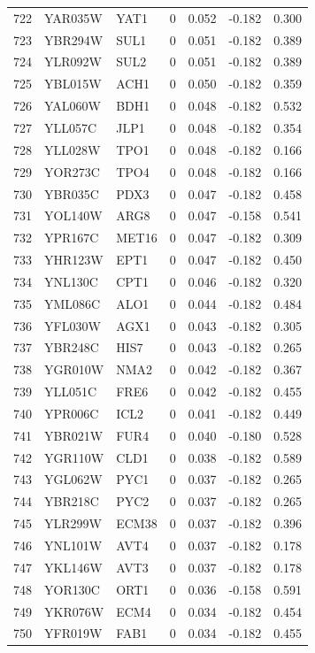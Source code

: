 \begin{longtable}{rllrrrr}
722 & YAR035W & YAT1 & 0 & 0.052 & -0.182 & 0.300\\
723 & YBR294W & SUL1 & 0 & 0.051 & -0.182 & 0.389\\
724 & YLR092W & SUL2 & 0 & 0.051 & -0.182 & 0.389\\
725 & YBL015W & ACH1 & 0 & 0.050 & -0.182 & 0.359\\
726 & YAL060W & BDH1 & 0 & 0.048 & -0.182 & 0.532\\
727 & YLL057C & JLP1 & 0 & 0.048 & -0.182 & 0.354\\
728 & YLL028W & TPO1 & 0 & 0.048 & -0.182 & 0.166\\
729 & YOR273C & TPO4 & 0 & 0.048 & -0.182 & 0.166\\
730 & YBR035C & PDX3 & 0 & 0.047 & -0.182 & 0.458\\
731 & YOL140W & ARG8 & 0 & 0.047 & -0.158 & 0.541\\
732 & YPR167C & MET16 & 0 & 0.047 & -0.182 & 0.309\\
733 & YHR123W & EPT1 & 0 & 0.047 & -0.182 & 0.450\\
734 & YNL130C & CPT1 & 0 & 0.046 & -0.182 & 0.320\\
735 & YML086C & ALO1 & 0 & 0.044 & -0.182 & 0.484\\
736 & YFL030W & AGX1 & 0 & 0.043 & -0.182 & 0.305\\
737 & YBR248C & HIS7 & 0 & 0.043 & -0.182 & 0.265\\
738 & YGR010W & NMA2 & 0 & 0.042 & -0.182 & 0.367\\
739 & YLL051C & FRE6 & 0 & 0.042 & -0.182 & 0.455\\
740 & YPR006C & ICL2 & 0 & 0.041 & -0.182 & 0.449\\
741 & YBR021W & FUR4 & 0 & 0.040 & -0.180 & 0.528\\
742 & YGR110W & CLD1 & 0 & 0.038 & -0.182 & 0.589\\
743 & YGL062W & PYC1 & 0 & 0.037 & -0.182 & 0.265\\
744 & YBR218C & PYC2 & 0 & 0.037 & -0.182 & 0.265\\
745 & YLR299W & ECM38 & 0 & 0.037 & -0.182 & 0.396\\
746 & YNL101W & AVT4 & 0 & 0.037 & -0.182 & 0.178\\
747 & YKL146W & AVT3 & 0 & 0.037 & -0.182 & 0.178\\
748 & YOR130C & ORT1 & 0 & 0.036 & -0.158 & 0.591\\
749 & YKR076W & ECM4 & 0 & 0.034 & -0.182 & 0.454\\
750 & YFR019W & FAB1 & 0 & 0.034 & -0.182 & 0.455\\

\end{longtable}
